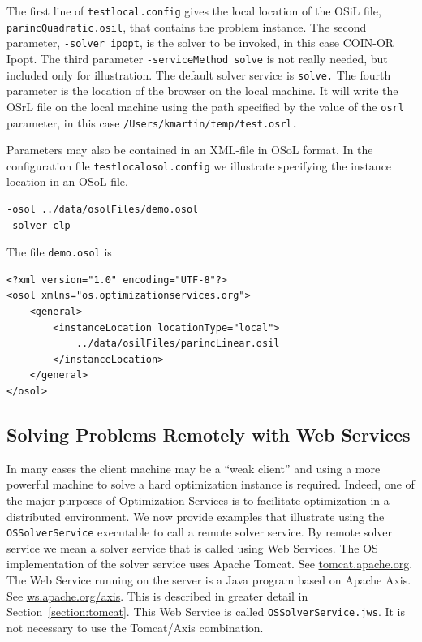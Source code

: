 \documentclass[11pt]{article}
\renewcommand{\_}{{\char"5F}}
\renewcommand{\{}{{\char"7B}}
\renewcommand{\}}{{\char"7D}}
\renewcommand{\^}{{\char"0D}}
\renewcommand{\'}{{\char"0D}}
\begin{document}
\begin{enumerate}[Step 1:]
The first line of {\tt testlocal.config} gives the local location 
of the OSiL file,
{\tt parincQuadratic.osil}, that contains the problem instance. The second parameter,
{\tt -solver ipopt},  is the solver to be invoked, in this case COIN-OR Ipopt.
The third parameter {\tt -serviceMethod solve} is not really needed,
but included only for illustration. The default solver service is {\tt solve.}
The fourth parameter is the location of the browser on the local machine.
It will write the OSrL file on the local machine using the path specified
by the value of the {\tt osrl} parameter, in this case
{\tt /Users/kmartin/temp/test.osrl.}

Parameters may also be contained in an XML-file in OSoL format. In the configuration file 
{\tt testlocalosol.config} we illustrate specifying the instance location in an OSoL file.
\begin{verbatim}
-osol ../data/osolFiles/demo.osol
-solver clp
\end{verbatim}
The file {\tt demo.osol} is

\begin{verbatim}
<?xml version="1.0" encoding="UTF-8"?>
<osol xmlns="os.optimizationservices.org">
    <general>
        <instanceLocation locationType="local">
            ../data/osilFiles/parincLinear.osil
        </instanceLocation>
    </general>
</osol>
\end{verbatim}


\subsection{Solving Problems Remotely with Web Services}\label{section:servicemethods}

In many cases the client machine may be a ``weak client'' and  using a more powerful machine to solve a 
hard optimization instance is required. Indeed, one of the major purposes of Optimization Services is to 
facilitate optimization in a distributed environment.   We now provide examples that illustrate using the 
{\tt OSSolverService} executable to call a remote solver service.   By remote solver service we mean a 
solver service that is called using Web Services.  The OS implementation  of the solver service  
uses Apache Tomcat. See \url{tomcat.apache.org}. The Web Service running on the server 
is a Java program based on Apache Axis. See \url{ws.apache.org/axis}. This is described 
in greater detail in Section~\ref{section:tomcat}.  
This Web Service is called {\tt OSSolverService.jws}. 
It is not necessary to use the Tomcat/Axis combination.




\end{enumerate}
\end{document}
